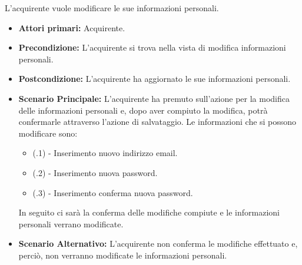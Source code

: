 L'acquirente vuole modificare le sue informazioni personali.
\begin{itemize}
    \item \textbf{Attori primari:} Acquirente.
    \item \textbf{Precondizione:} L'acquirente si trova nella vista di modifica informazioni personali.
    \item \textbf{Postcondizione:} L'acquirente ha aggiornato le sue informazioni personali.
    \item \textbf{Scenario Principale:} L'acquirente ha premuto sull'azione per la modifica delle informazioni personali e, dopo aver compiuto la modifica, potrà confermarle attraverso l'azione di salvataggio. Le informazioni che si possono modificare sono:
    \begin{itemize}
        \item (\actualUC.1) - Inserimento nuovo indirizzo email.
        \item (\actualUC.2) - Inserimento nuova password.
        \item (\actualUC.3) - Inserimento conferma nuova password.
    \end{itemize}
    In seguito ci sarà la conferma delle modifiche compiute e le informazioni personali verrano modificate.
    \item \textbf{Scenario Alternativo:} L'acquirente non conferma le modifiche effettuato e, perciò, non verranno modificate le informazioni personali.
\end{itemize}
\resetSubUC

